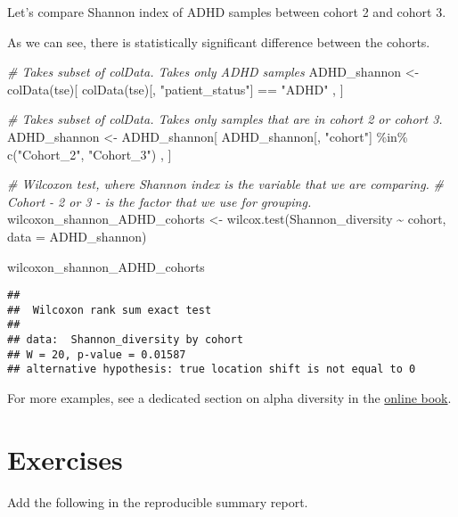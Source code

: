 \documentclass[
]{book}
\newenvironment{Shaded}{\begin{snugshade}}{\end{snugshade}}
\newcommand{\AttributeTok}[1]{\textcolor[rgb]{0.77,0.63,0.00}{#1}}
\newcommand{\CommentTok}[1]{\textcolor[rgb]{0.56,0.35,0.01}{\textit{#1}}}
\newcommand{\FunctionTok}[1]{\textcolor[rgb]{0.00,0.00,0.00}{#1}}
\newcommand{\NormalTok}[1]{#1}
\newcommand{\OtherTok}[1]{\textcolor[rgb]{0.56,0.35,0.01}{#1}}
\newcommand{\SpecialCharTok}[1]{\textcolor[rgb]{0.00,0.00,0.00}{#1}}
\newcommand{\StringTok}[1]{\textcolor[rgb]{0.31,0.60,0.02}{#1}}
\begin{document}
Let's compare Shannon index of ADHD samples between cohort 2 and cohort 3.

As we can see, there is statistically significant difference between the cohorts.

\begin{Shaded}
\begin{Highlighting}[]
\CommentTok{\# Takes subset of colData. Takes only ADHD samples}
\NormalTok{ADHD\_shannon }\OtherTok{\textless{}{-}} \FunctionTok{colData}\NormalTok{(tse)[ }\FunctionTok{colData}\NormalTok{(tse)[, }\StringTok{"patient\_status"}\NormalTok{] }\SpecialCharTok{==} \StringTok{"ADHD"}\NormalTok{ , ]}

\CommentTok{\# Takes subset of colData. Takes only samples that are in cohort 2 or cohort 3.}
\NormalTok{ADHD\_shannon }\OtherTok{\textless{}{-}}\NormalTok{ ADHD\_shannon[ ADHD\_shannon[, }\StringTok{"cohort"}\NormalTok{] }\SpecialCharTok{\%in\%} \FunctionTok{c}\NormalTok{(}\StringTok{"Cohort\_2"}\NormalTok{, }\StringTok{"Cohort\_3"}\NormalTok{) , ]}

\CommentTok{\# Wilcoxon test, where Shannon index is the variable that we are comparing. }
\CommentTok{\# Cohort {-} 2 or 3 {-} is the factor that we use for grouping. }
\NormalTok{wilcoxon\_shannon\_ADHD\_cohorts }\OtherTok{\textless{}{-}} \FunctionTok{wilcox.test}\NormalTok{(Shannon\_diversity }\SpecialCharTok{\textasciitilde{}}\NormalTok{ cohort, }\AttributeTok{data =}\NormalTok{ ADHD\_shannon)}

\NormalTok{wilcoxon\_shannon\_ADHD\_cohorts}
\end{Highlighting}
\end{Shaded}

\begin{verbatim}
## 
##  Wilcoxon rank sum exact test
## 
## data:  Shannon_diversity by cohort
## W = 20, p-value = 0.01587
## alternative hypothesis: true location shift is not equal to 0
\end{verbatim}

For more examples, see a dedicated section on alpha diversity in the
\href{https://microbiome.github.io/OMA/microbiome-diversity.html\#alpha-diversity}{online book}.

\hypertarget{exercises}{%
\section{Exercises}\label{exercises}}

Add the following in the reproducible summary report.
\end{document}

